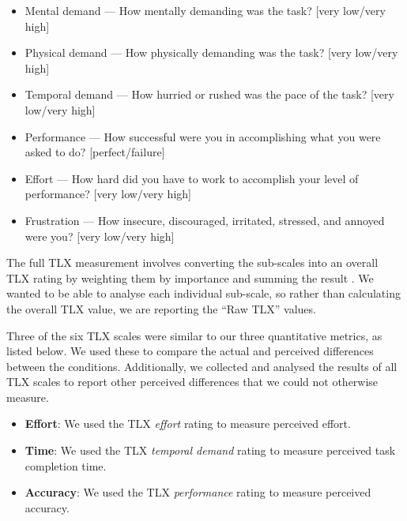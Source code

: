 {\singlespacing
\begin{itemize}
  \item Mental demand --- How mentally demanding was the task? [very low/very high]
  \item Physical demand --- How physically demanding was the task? [very low/very high]
  \item Temporal demand --- How hurried or rushed was the pace of the task?  [very low/very high]
  \item Performance --- How successful were you in accomplishing what you were asked to do? [perfect/failure]
  \item Effort --- How hard did you have to work to accomplish your level of performance? [very low/very high]
  \item Frustration --- How insecure, discouraged, irritated, stressed, and annoyed were you? [very low/very high]
\end{itemize}
}

The full TLX measurement involves converting the sub-scales into an overall TLX rating by weighting them by importance
and summing the result \citep{Hart2006}. We wanted to be able to analyse each individual sub-scale, so rather than
calculating the overall TLX value, we are reporting the ``Raw TLX'' values.

Three of the six TLX scales were similar to our three quantitative metrics, as listed below. We used these to
compare the actual and perceived differences between the conditions. Additionally, we collected and analysed the
results of all TLX scales to report other perceived differences that we could not otherwise measure.


\begin{itemize}
  \item \textbf{Effort}:
    We used the TLX \textit{effort} rating to measure perceived effort.
  \item \textbf{Time}:
    We used the TLX \textit{temporal demand} rating to measure perceived task completion time.
  \item \textbf{Accuracy}:
    We used the TLX \textit{performance} rating to measure perceived accuracy.
\end{itemize}

